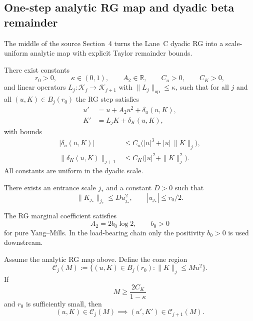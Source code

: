 \subsection{One-step analytic RG map and dyadic beta remainder}
The middle of the source Section~4 turns the Lane~C dyadic RG into a scale-uniform analytic map with explicit Taylor remainder bounds.

\begin{proposition}
There exist constants
\[
r_0>0,\qquad \kappa\in(0,1),\qquad A_2\in\mathbb R,\qquad C_u>0,\qquad C_K>0,
\]
and linear operators $L_j:\mathcal K_j\to \mathcal K_{j+1}$ with $\|L_j\|_{\mathrm{op}}\le \kappa$, such that for all $j$ and all $(u,K)\in B_j(r_0)$ the RG step satisfies
\begin{align}
u' &= u + A_2 u^2 + \delta_u(u,K),\\
K' &= L_j K + \delta_K(u,K),
\end{align}
with bounds
\begin{align}
|\delta_u(u,K)| &\le C_u \bigl(|u|^3 + |u|\,\|K\|_j\bigr),\\
\|\delta_K(u,K)\|_{j+1} &\le C_K \bigl(|u|^2 + \|K\|_j^2\bigr).
\end{align}
All constants are uniform in the dyadic scale.
\end{proposition}

\begin{proposition}
There exists an entrance scale $j_\ast$ and a constant $D>0$ such that
\[
\|K_{j_\ast}\|_{j_\ast}\le D u_{j_\ast}^2,
\qquad
|u_{j_\ast}|\le r_0/2.
\]
\end{proposition}

\begin{proposition}
The RG marginal coefficient satisfies
\[
A_2 = 2b_0 \log 2,
\qquad b_0>0
\]
for pure Yang--Mills. In the load-bearing chain only the positivity $b_0>0$ is used downstream.
\end{proposition}

\begin{lemma}
Assume the analytic RG map above. Define the cone region
\[
\mathcal C_j(M):=\{(u,K)\in B_j(r_0): \|K\|_j\le M u^2\}.
\]
If
\[
M\ge \frac{2C_K}{1-\kappa}
\]
and $r_0$ is sufficiently small, then
\[
(u,K)\in \mathcal C_j(M)\implies (u',K')\in \mathcal C_{j+1}(M).
\]
\end{lemma}

